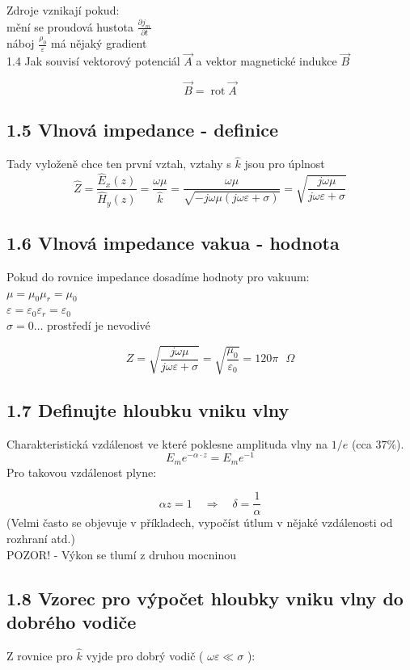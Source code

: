 \documentclass[10pt]{article}
\begin{document}
Zdroje vznikají pokud:\\
mění se proudová hustota $\frac{\partial j_{m}}{\partial t}$\\
náboj $\frac{\rho_{0}}{\varepsilon}$ má nějaký gradient\\
1.4 Jak souvisí vektorový potenciál $\vec{A}$ a vektor magnetické indukce $\vec{B}$

$$
\vec{B}=\operatorname{rot} \vec{A}
$$

\subsection*{1.5 Vlnová impedance - definice}
Tady vyloženě chce ten první vztah, vztahy s $\hat k$ jsou pro úplnost \\
$$
\hat{Z}=\frac{\hat{E}_{x}(z)}{\hat{H}_{y}(z)}=\frac{\omega \mu}{\hat{k}}=\frac{\omega \mu}{\sqrt{-j \omega \mu(j \omega \varepsilon+\sigma)}}=\sqrt{\frac{j \omega \mu}{j \omega \varepsilon+\sigma}}
$$
\newpage
\subsection*{1.6 Vlnová impedance vakua - hodnota}
Pokud do rovnice impedance dosadíme hodnoty pro vakuum:\\
$\mu=\mu_{0} \mu_{r}=\mu_{0}$\\
$\varepsilon=\varepsilon_{0} \varepsilon_{r}=\varepsilon_{0}$\\
$\sigma=0 \ldots$ prostředí je nevodivé

$$
Z=\sqrt{\frac{j \omega \mu}{j \omega \varepsilon+\sigma}}=\sqrt{\frac{\mu_{0}}{\varepsilon_{0}}}=120 \pi\text{ } \Omega
$$

\subsection*{1.7 Definujte hloubku vniku vlny}
Charakteristická vzdálenost ve které poklesne amplituda vlny na $1 / e$ (cca $37 \%$).\\
$$
E_{m} e^{-\alpha \cdot z}=E_{m} e^{-1}
$$
Pro takovou vzdálenost plyne:

$$
\alpha z=1 \quad \Rightarrow \quad \delta=\frac{1}{\alpha}
$$
(Velmi často se objevuje v příkladech, vypočíst útlum v nějaké vzdálenosti od rozhraní atd.) \\
POZOR! - Výkon se tlumí z druhou mocninou \\
\subsection*{1.8 Vzorec pro výpočet hloubky vniku vlny do dobrého vodiče}
Z rovnice pro $\hat{k}$ vyjde pro dobrý vodič ( $\omega \varepsilon \ll \sigma$ ):
\end{document}
